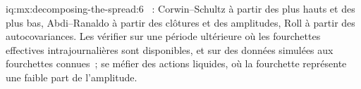 \begin{solution}{iq:mx:decomposing-the-spread:6}
~: Corwin--Schultz à partir des plus hauts et des plus bas, Abdi--Ranaldo à partir des clôtures et des amplitudes, Roll à partir des autocovariances. Les vérifier sur une période ultérieure
où les fourchettes effectives intrajournalières sont disponibles, et sur des données simulées aux fourchettes connues~; se méfier des actions liquides, où la fourchette représente une faible
part de l'amplitude.
\end{solution}

